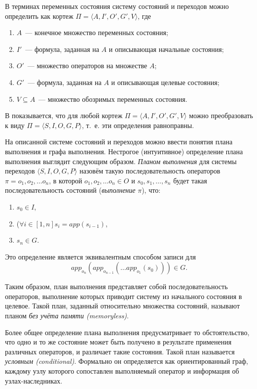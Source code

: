 В терминах переменных состояния систему состояний и переходов можно определить как кортеж $\Pi = \langle A, I', O', G', V \rangle$, где 
\begin{enumerate}
 \item $A$~--- конечное множество переменных состояния;
 \item $I'$~--- формула, заданная на $A$ и описывающая начальные состояния;
 \item $O'$~--- множество операторов на множестве $A$;
 \item $G'$~--- формула, заданная на $A$ и описывающая целевые состояния;
 \item $V \subseteq A$~--- множество обозримых переменных состояния.
\end{enumerate}

В \cite{transition-sys} показывается, что для любой кортеж $\Pi = \langle A, I', O', G', V \rangle$ можно преобразовать к виду $\Pi = \langle S, I, O, G, P\rangle$, т.~е. эти определения равноправны.

На описанной системе состояний и переходов можно ввести понятия плана выполнения и графа выполнения. Нестрогое (интуитивное) определение плана выполнения выглядит следующим образом. \textit{Планом выполнения} для системы переходов $\langle S, I, O, G, P\rangle$ назовём такую последовательность операторов $\pi = o_1, o_2, \ldots o_n$, в которой $o_1, o_2, \ldots o_n \in O$ и $s_0, s_1, \ldots, s_n$ будет такая последовательность состояний (\textit{выполнение} $\pi$), что:
\begin{enumerate}
 \item $s_0 \in I$,
 \item ($\forall i \in [1,n] s_i = app(s_{i - 1})$,
 \item $s_n \in G$.
\end{enumerate}

Это определение является эквивалентным способом записи для
\begin{equation*}
 app_{o_n}(app_{o_{n-1}}(\ldots app_{o_1}(s_0))) \in G.
\end{equation*}

Таким образом, план выполнения представляет собой последовательность операторов, выполнение которых приводит систему из начального состояния в целевое. Такой план, заданный относительно множества состояний, называют планом \textit{без учёта памяти (memoryless)}.

Более общее определение плана выполнения предусматривает то обстоятельство, что одно и то же состояние может быть получено в результате применения различных операторов, и различает такие состояния. Такой план называется \textit{условным (conditional)}. Формально он определяется как ориентированный граф, каждому узлу которого сопоставлен выполняемый оператор и информация об узлах-наследниках. 

